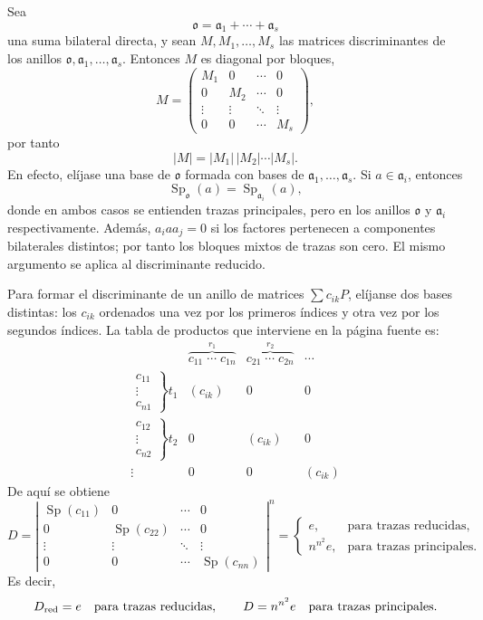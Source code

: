 \documentclass[11pt]{article}
\providecommand{\mo}{\mathfrak{o}}
\providecommand{\ma}{\mathfrak{a}}
\begin{document}
Sea
\[
        \mo=\ma_1+\cdots+\ma_s
\]
una suma bilateral directa, y sean $M,M_1,\ldots,M_s$ las matrices discriminantes de los anillos $\mo,\ma_1,\ldots,\ma_s$. Entonces $M$ es diagonal por bloques,
\[
        M=\begin{pmatrix}
        M_1&0&\cdots&0\\
        0&M_2&\cdots&0\\
        \vdots&\vdots&\ddots&\vdots\\
        0&0&\cdots&M_s
        \end{pmatrix},
\]
por tanto
\[
        |M|=|M_1|\,|M_2|\cdots |M_s|.
\]
En efecto, elíjase una base de $\mo$ formada con bases de $\ma_1,\ldots,\ma_s$. Si $a\in\ma_i$, entonces
\[
        \operatorname{Sp}_\mo(a)=\operatorname{Sp}_{\ma_i}(a),
\]
donde en ambos casos se entienden trazas principales, pero en los anillos $\mo$ y $\ma_i$ respectivamente. Además, $a_i a a_j=0$ si los factores pertenecen a componentes bilaterales distintos; por tanto los bloques mixtos de trazas son cero. El mismo argumento se aplica al discriminante reducido.

Para formar el discriminante de un anillo de matrices $\sum c_{ik}P$, elíjanse dos bases distintas: los $c_{ik}$ ordenados una vez por los primeros índices y otra vez por los segundos índices. La tabla de productos que interviene en la página fuente es:
\[
\begin{array}{c|ccc}
& \overbrace{c_{11}\;\cdots\;c_{1n}}^{r_1}
& \overbrace{c_{21}\;\cdots\;c_{2n}}^{r_2}
& \cdots \\ \hline
\left.\begin{array}{c}c_{11}\\[-1mm]\vdots\\[-1mm]c_{n1}\end{array}\right\}t_1
& (c_{ik}) & 0 & 0 \\[1.3em]
\left.\begin{array}{c}c_{12}\\[-1mm]\vdots\\[-1mm]c_{n2}\end{array}\right\}t_2
& 0 & (c_{ik}) & 0 \\[1.3em]
\vdots & 0 & 0 & (c_{ik})
\end{array}
\]
De aquí se obtiene
\[
        D=\left|\begin{array}{cccc}
        \operatorname{Sp}(c_{11})&0&\cdots&0\\
        0&\operatorname{Sp}(c_{22})&\cdots&0\\
        \vdots&\vdots&\ddots&\vdots\\
        0&0&\cdots&\operatorname{Sp}(c_{nn})
        \end{array}\right|^{n}
        =\begin{cases}
        e, & \text{para trazas reducidas},\\
        n^{n^2}e, & \text{para trazas principales}.
        \end{cases}
\]
Es decir,
\[
        D_{\rm red}=e
        \quad\hbox{para trazas reducidas},
        \qquad
        D=n^{n^2}e
        \quad\hbox{para trazas principales}.
\]
\end{document}

